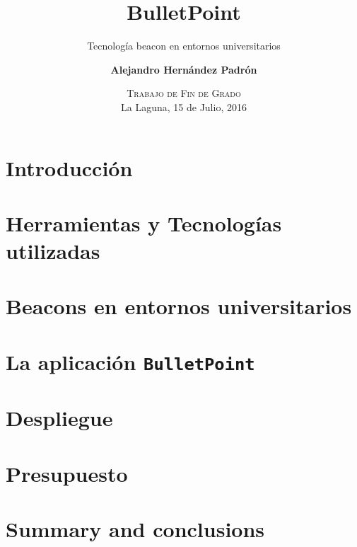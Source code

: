 \documentclass[blue,uncompressed]{beamer}
\title{\textbf{BulletPoint}}
\subtitle{Tecnología beacon en entornos universitarios}
\author[Alejandro Hernández Padrón]
{
	\textbf{Alejandro Hernández Padrón}
}
\institute[ULL]
\date[Trabajo de Fin de Grado]{\textsc{Trabajo de Fin de Grado}     \\
                           La Laguna, 15 de Julio, 2016}
\newcommand{\BulletPoint}{\texttt{BulletPoint{}}}
\begin{document}
	\begin{frame}[plain]
	\titlepage
	\end{frame}

		\section{Introducción}
			
		\section{Herramientas y Tecnologías utilizadas}
			
		\section{Beacons en entornos universitarios}
			
		\section{La aplicación \BulletPoint}
			
		\section{Despliegue}
			
		\section{Presupuesto}	
			
		\section{Summary and conclusions}
			
		
		
\end{document}
